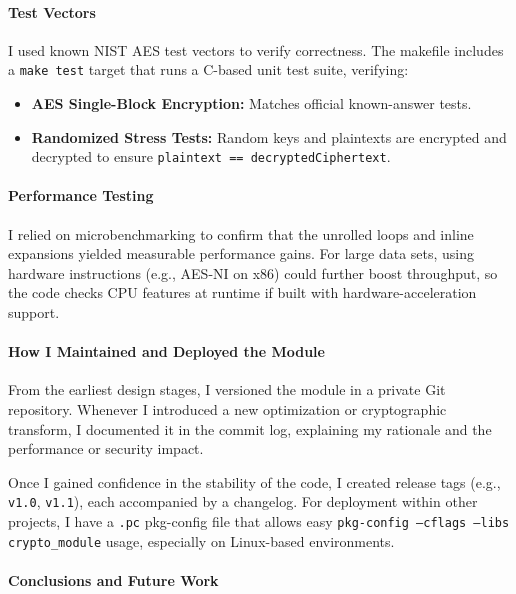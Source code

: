\paragraph{Test Vectors}

I used known NIST AES test vectors to verify correctness. The makefile includes a \texttt{make test} target that runs a C-based unit test suite, verifying:

\begin{itemize}
	\item \textbf{AES Single-Block Encryption:} Matches official known-answer tests.
	\item \textbf{Randomized Stress Tests:} Random keys and plaintexts are encrypted and decrypted to ensure \texttt{plaintext == decryptedCiphertext}.
\end{itemize}

\paragraph{Performance Testing}
I relied on microbenchmarking to confirm that the unrolled loops and inline expansions yielded measurable performance gains. For large data sets, using hardware instructions (e.g., AES-NI on x86) could further boost throughput, so the code checks CPU features at runtime if built with hardware-acceleration support.

\paragraph{How I Maintained and Deployed the Module}

From the earliest design stages, I versioned the module in a private Git repository. Whenever I introduced a new optimization or cryptographic transform, I documented it in the commit log, explaining my rationale and the performance or security impact.

Once I gained confidence in the stability of the code, I created release tags (e.g., \texttt{v1.0}, \texttt{v1.1}), each accompanied by a changelog. For deployment within other projects, I have a \texttt{.pc} pkg-config file that allows easy \texttt{pkg-config --cflags --libs crypto\_module} usage, especially on Linux-based environments.

\paragraph{Conclusions and Future Work}

